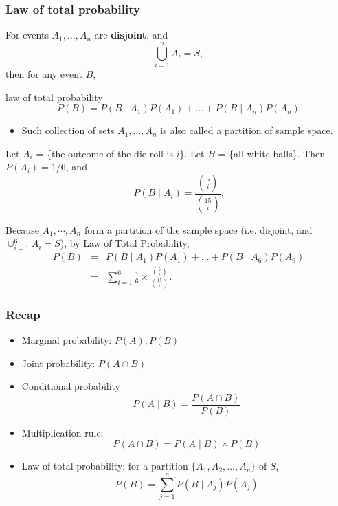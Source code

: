 \documentclass[slidestop,compress,mathserif]{beamer}
\begin{document}
\begin{frame}\frametitle{Law of total probability}

For events $A_1,\ldots,A_n$  are {\bf disjoint}, and
\[ \bigcup_{i=1}^n A_i = S,\]
then for any event $B$, 
\begin{dinglist}{\DingListSymbolA}
\item  law of total probability
\[P(B)=P(B \mid A_1)P(A_1)+\ldots+P(B \mid A_n)P(A_n)\]
\end{dinglist}
\begin{itemize}
\item Such collection of sets $A_1,\ldots,A_n$ is also called a partition of sample space.
\end{itemize}

\end{frame}


\begin{frame}

\pause

Let $A_i$ = \{the outcome of the die roll is $i$\}. Let $B$ = \{all white balls\}.
Then $P(A_i) = 1/6$, and
\begin{equation*}
P(B \mid A_i) = \frac{{5 \choose i}}{{15 \choose i}}.
\end{equation*}

Because $A_1, \cdots, A_n$ form a partition of the sample space (i.e. disjoint, and $\cup_{i=1}^{6} A_i = S$), by Law of Total Probability,
{\small{
\begin{eqnarray*}
P(B) &=& P(B \mid A_1)P(A_1)+\ldots+P(B \mid A_6)P(A_6) \\
        &=& \sum_{i=1}^{6} \frac{1}{6} \times \frac{{5 \choose i}}{{15 \choose i}}.
\end{eqnarray*}
}}
\end{frame}

\begin{frame}\frametitle{Recap}

\begin{itemize}
\item Marginal probability: $P(A), P(B)$
\item Joint probability: $P(A \cap B)$
\item Conditional probability
\[ P(A \mid B)=\frac{P(A \cap B)}{P(B)}\]
\pause
\item Multiplication rule:
\[P(A \cap B)=P(A \mid B)\times P(B)\]
\item Law of total probability: for a partition $\{A_1, A_2, \ldots, A_n\}$ of $S$,
\[P(B)= \sum_{j = 1}^nP(B \mid A_j)P(A_j)\]
\end{itemize}


\end{frame}
\end{document}
